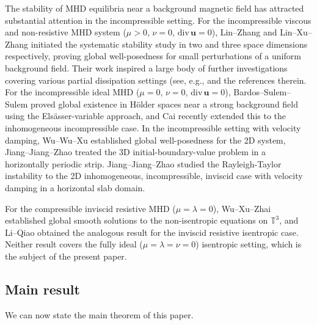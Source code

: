 \documentclass[12pt, reqno]{amsart}
\numberwithin{equation}{section}
\numberwithin{equation}{section}
\numberwithin{equation}{section}
\numberwithin{equation}{section}
\theoremstyle{remark}
\begin{document}
\medskip
The stability of MHD equilibria near a background magnetic field has
attracted substantial attention in the incompressible setting. For the incompressible viscous and non-resistive MHD system
($\mu>0$, $\nu=0$, $\mathrm{div}\,\mathbf{u}=0$), Lin--Zhang
\cite{Lin-Zhang} and Lin--Xu--Zhang \cite{Lin-Zhang1} initiated the
systematic stability study in two and three space dimensions
respectively, proving global well-posedness for small perturbations of
a uniform background field.  Their work inspired a large body of further
investigations covering various partial dissipation settings (see, e.g.,
\cite{Chen-Zhang-Zhou, GBM, L-Zhang, Jiang-Jang1, PZZ,
	Ren-Wu-Xia-Zhang, Ren-Xiang-Zhang, Tan-Wang, Wu-Zhu1, Xie-Jiu-Liu, Xu-Zhang,
	 zhaijde, Zhou-Zhu} and the references therein.
For the incompressible ideal MHD ($\mu=0$, $\nu=0$, $\mathrm{div}\,\mathbf{u}=0$),
Bardos--Sulem--Sulem \cite{BSS} proved global existence in H\"older spaces
near a strong background field using the Els\"asser-variable approach,
and Cai \cite{Cai} recently extended this to the inhomogeneous
incompressible case.  In the incompressible setting with velocity damping,
Wu--Wu--Xu \cite{Wu-Wu-Xu} established global well-posedness for the 2D
system, Jiang--Jiang--Zhao \cite{JJZ} treated the 3D
initial-boundary-value problem in a horizontally periodic strip. Jiang--Jiang--Zhao \cite{JJZ1} studied the Rayleigh-Taylor instability  to the 2D inhomogeneous, incompressible, inviscid case with velocity damping  in a  horizontal slab domain.

\medskip
For the compressible inviscid resistive  MHD ($\mu=\lambda=0$),
Wu--Xu--Zhai \cite{Wu-Xu-Zhai} established global smooth solutions to the
non-isentropic equations on $\mathbb{T}^3$, and Li--Qiao \cite{Li-Qiao}
obtained the analogous result for the inviscid resistive isentropic
case.  Neither result covers the fully ideal ($\mu=\lambda=\nu=0$) isentropic
setting, which is the subject of the present paper.

\subsection{Main result}

We can now state the main theorem of this paper.
\end{document}
